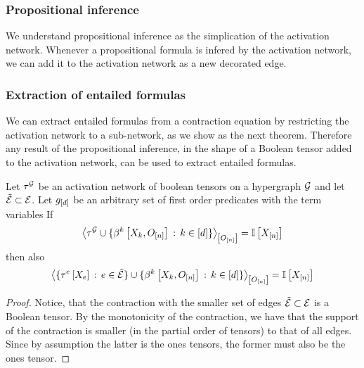 \subsubsection{Propositional inference}

We understand propositional inference as the simplication of the activation network.
Whenever a propositional formula is infered by the activation network, we can add it to the activation network as a new decorated edge.

\subsubsection{Extraction of entailed formulas}

We can extract entailed formulas from a contraction equation by restricting the activation network to a sub-network, as we show as the next theorem.
Therefore any result of the propositional inference, in the shape of a Boolean tensor added to the activation network, can be used to extract entailed formulas.

\begin{theorem}
    Let $\tau^{\mathcal{G}}$ be an activation network of boolean tensors on a hypergraph $\mathcal{G}$ and let $\tilde{\mathcal{E}}\subset\mathcal{E}$.
    Let $g_{[d]}$ be an arbitrary set of first order predicates with the term variables
    If
    \begin{align*}
        \contractionof{\extnet\cup
            \{\bencodingofat{\catenumerator}{\catvariableof{\catenumerator},\indvariableof{[n]}} \wcols \catenumeratorin\}
        }{\indvariableof{[n]}}
        = \onesat{\catvariableof{[n]}}
    \end{align*}
    then also
    \begin{align*}
        \contractionof{
            \{\hypercoreofat{\edge}{\catvariableof{\edge}}\wcols\edge\in\secedges\}
            \cup
            \{\bencodingofat{\catenumerator}{\catvariableof{\catenumerator},\indvariableof{[n]}} \wcols \catenumeratorin\}
        }{\indvariableof{[n]}}
        = \onesat{\catvariableof{[n]}}
    \end{align*}
\end{theorem}
\begin{proof}
    Notice, that the contraction with the smaller set of edges $\tilde{\mathcal{E}}\subset\mathcal{E}$ is a Boolean tensor.
    By the monotonicity of the contraction, we have that the support of the contraction is smaller (in the partial order of tensors) to that of all edges.
    Since by assumption the latter is the ones tensors, the former must also be the ones tensor.
\end{proof}




